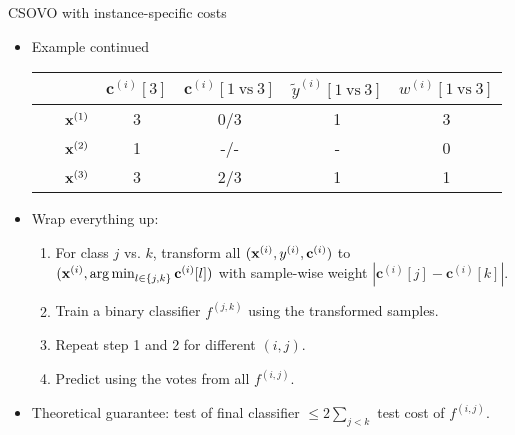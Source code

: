\documentclass[11pt,compress,t,notes=noshow, xcolor=table]{beamer}
\newcommand{\cv}{\mathbf{c}}    %
\begin{document}
\begin{vbframe}{CSOVO with instance-specific costs}
    \footnotesize
    \begin{itemize}
    \item Example continued
            \begin{center}                                       
        \begin{tabular}{cc|cccc}\
        			& & $\cv^{(i)}[3]$ & $\cv^{(i)}[1 \ \text{vs} \ 3]$ & $\tilde{y}^{( i)}[1 \ \text{vs} \ 3]$ & $w^{(i)}[1 \ \text{vs} \ 3]$\\
        			\hline & $\mathbf{x}^{(1)}$ & 3 & 0/3 & 1 & 3\\
        			& $\mathbf{x}^{(2)}$ & 1 & -/- & - & 0 \\
                 	& $\mathbf{x}^{(3)}$ & 3 & 2/3 & 1 & 1\\
                \end{tabular}
    \end{center}
            \vspace{5pt}

    \item Wrap everything up:
    \begin{enumerate}
        \footnotesize
        \item For class $j$ vs. $k$, transform all $(\xi, \yi, \cv^{(i)})$ to $(\xi, \argmin_{l \in \{j, k\}} \cv^{(i)}[l])$ with sample-wise weight $|\cv^{(i)}[j] - \cv^{(i)}[k]|$.
        \vspace{5pt}
        
        \item Train a binary classifier $f^{(j, k)}$ using the transformed samples.
        \vspace{5pt}
        
        \item Repeat step 1 and 2 for different $(i, j)$.
        \vspace{5pt}
        
        \item Predict using the votes from all $f^{(i, j)}$.
    \end{enumerate}
    \vspace{5pt}

    \item Theoretical guarantee: test of final classifier $\leq 2\sum_{j < k}$ test cost of $f^{(i, j)}$. 
    \end{itemize}
\end{vbframe}
\end{document}
